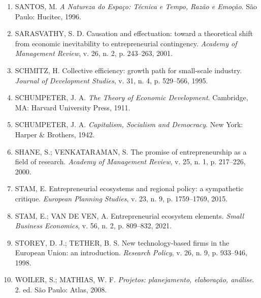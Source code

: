 \begin{enumerate}[leftmargin=1.5em, itemsep=3.5pt]
  \item SANTOS, M. \textit{A Natureza do Espaço: Técnica e Tempo, Razão e Emoção}. São Paulo: Hucitec, 1996.
  \item SARASVATHY, S. D. Causation and effectuation: toward a theoretical shift from economic inevitability to entrepreneurial contingency. \textit{Academy of Management Review}, v. 26, n. 2, p. 243--263, 2001.
  \item SCHMITZ, H. Collective efficiency: growth path for small-scale industry. \textit{Journal of Development Studies}, v. 31, n. 4, p. 529--566, 1995.
  \item SCHUMPETER, J. A. \textit{The Theory of Economic Development}. Cambridge, MA: Harvard University Press, 1911.
  \item SCHUMPETER, J. A. \textit{Capitalism, Socialism and Democracy}. New York: Harper \& Brothers, 1942.
  \item SHANE, S.; VENKATARAMAN, S. The promise of entrepreneurship as a field of research. \textit{Academy of Management Review}, v. 25, n. 1, p. 217--226, 2000.
  \item STAM, E. Entrepreneurial ecosystems and regional policy: a sympathetic critique. \textit{European Planning Studies}, v. 23, n. 9, p. 1759--1769, 2015.
  \item STAM, E.; VAN DE VEN, A. Entrepreneurial ecosystem elements. \textit{Small Business Economics}, v. 56, n. 2, p. 809--832, 2021.
  \item STOREY, D. J.; TETHER, B. S. New technology-based firms in the European Union: an introduction. \textit{Research Policy}, v. 26, n. 9, p. 933--946, 1998.
  \item WOILER, S.; MATHIAS, W. F. \textit{Projetos: planejamento, elaboração, análise}. 2. ed. São Paulo: Atlas, 2008.
\end{enumerate}
